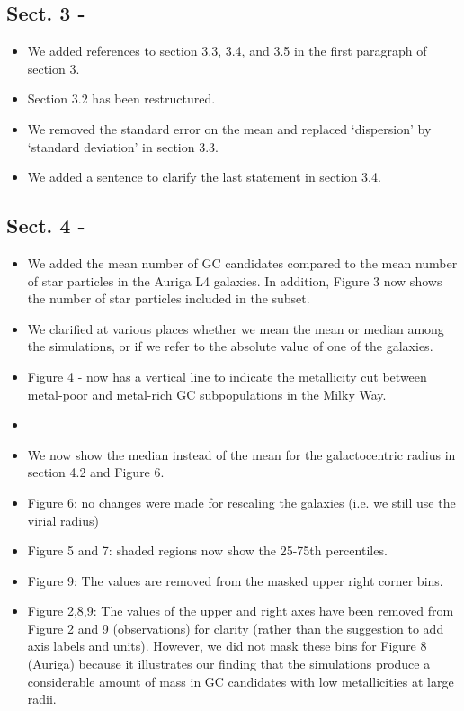\documentclass{article}
\begin{document}
\subsection*{Sect. 3 -}
\begin{itemize}
\item We added references to section 3.3, 3.4, and 3.5 in the first paragraph of section 3.
\item Section 3.2 has been restructured.
\item We removed the standard error on the mean and replaced `dispersion' 
by `standard deviation' in section 3.3.
\item We added a sentence to clarify the last statement in section 3.4.
\end{itemize}

\subsection*{Sect. 4 -}
\begin{itemize}
\item We added the mean number of GC candidates compared to the mean number of
star particles in the Auriga L4 galaxies. In addition, Figure 3 now shows the 
number of star particles included in the subset.
\item We clarified at various places whether we mean the mean or median among
the simulations, or if we refer to the absolute value of one of the galaxies.
\item Figure 4 - now has a vertical line to indicate the metallicity cut 
between metal-poor and metal-rich GC subpopulations in the Milky Way.
\item
\item We now show the median instead of the mean for the galactocentric radius in
section 4.2 and Figure 6.
\item Figure 6: no changes were made for rescaling the galaxies (i.e. we still
use the virial radius)
\item Figure 5 and 7: shaded regions now show the 25-75th percentiles.
\item Figure 9: The values are removed from the masked upper right corner bins.
\item Figure 2,8,9: The values of the upper and right axes have been removed from
Figure 2 and 9 (observations) for clarity (rather than the suggestion to add 
axis labels and units). However, we did not mask these bins for Figure 8 (Auriga)
because it illustrates our finding that the simulations produce a considerable
amount of mass in GC candidates with low metallicities at large radii.
\end{itemize}
\end{document}
